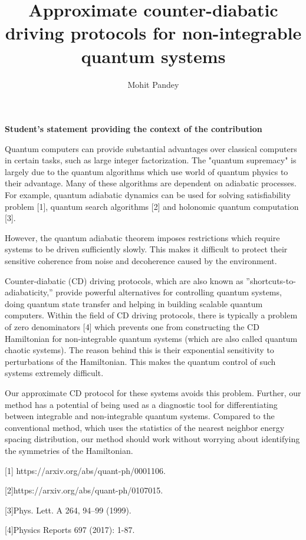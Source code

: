 \documentclass[11pt,a4paper]{article}
\author{Mohit Pandey}
\title{Approximate counter-diabatic driving protocols for non-integrable quantum systems  }
\begin{document}
\maketitle
\textbf{Student's statement  providing the context of the contribution}


Quantum computers can provide substantial advantages over classical computers in certain tasks, such as large integer factorization. The "quantum supremacy" is largely due to the quantum algorithms which use 
world of quantum physics to their advantage. Many of these algorithms are dependent on adiabatic processes. For example, quantum adiabatic dynamics can be used for solving satisfiability problem [1], quantum search algorithms [2] and holonomic quantum computation [3]. 

However, the quantum adiabatic theorem imposes restrictions which require systems to be driven sufficiently slowly. This makes it difficult to protect their 
sensitive coherence from noise and decoherence caused by the environment.


Counter-diabatic (CD) driving protocols, which are also known as ”shortcuts-to-adiabaticity,” provide powerful alternatives for controlling quantum systems, doing quantum state transfer and helping in building scalable quantum computers. Within the field of CD driving protocols, there is typically a problem of zero denominators  [4] which prevents one from constructing the CD Hamiltonian for non-integrable quantum systems (which are also called quantum chaotic systems). The reason behind this is their exponential sensitivity to perturbations of the Hamiltonian. This makes the quantum control  of such systems extremely difficult.

Our approximate CD protocol for these systems avoids this problem. Further, our method has a potential of being used as a diagnostic tool for differentiating between integrable and non-integrable quantum systems. Compared to the conventional method, which uses the statistics of the nearest neighbor energy spacing distribution, our method should work without worrying about identifying the symmetries of the Hamiltonian. 

[1] https://arxiv.org/abs/quant-ph/0001106.

[2]https://arxiv.org/abs/quant-ph/0107015.

[3]Phys. Lett. A 264, 94–99 (1999).

[4]Physics Reports 697 (2017): 1-87.
\end{document}
